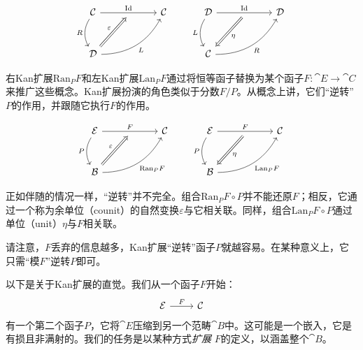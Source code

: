 \documentclass[DaoFP]{subfiles}
\begin{document}
 \[
  \begin{tikzcd} [row sep=1cm, column sep=1cm]
   \cat C
   \arrow[rr, "\text{Id}", "" {name=ID, below} ]
   \arrow[d, bend right, "R"']
   && \cat C
   \\
   \cat D
   \arrow[urr, bend right, "L"']
   \arrow[Rightarrow, "\varepsilon",  to=ID]
  \end{tikzcd}
  \qquad
  \begin{tikzcd} [row sep=1cm, column sep=1cm]
   \cat D
   \arrow[rr, "\text{Id}", "" {name=ID, below} ]
   \arrow[d, bend right, "L"']
   && \cat D
   \\
   \cat C
   \arrow[urr, bend right, "R"']
   \arrow[Rightarrow, "\eta",  from=ID]
  \end{tikzcd}
 \]

 右Kan扩展$\text{Ran}_P F$和左Kan扩展$\text{Lan}_P F$通过将恒等函子替换为某个函子$F \colon \cat E \to \cat C$来推广这些概念。Kan扩展扮演的角色类似于分数$F/P$。从概念上讲，它们“逆转”$P$的作用，并跟随它执行$F$的作用。

 \[
  \begin{tikzcd} [row sep=1cm, column sep=1cm]
   \cat E
   \arrow[rr, "F", "" {name=ID, below} ]
   \arrow[d, bend right, "P"']
   && \cat C
   \\
   \cat B
   \arrow[urr, bend right, "\text{Ran}_P F"']
   \arrow[Rightarrow, "\varepsilon",  to=ID]
  \end{tikzcd}
  \qquad
  \begin{tikzcd} [row sep=1cm, column sep=1cm]
   \cat E
   \arrow[rr, "F", "" {name=ID, below} ]
   \arrow[d, bend right, "P"']
   && \cat C
   \\
   \cat B
   \arrow[urr, bend right, "\text{Lan}_P F"']
   \arrow[Rightarrow, "\eta",  from=ID]
  \end{tikzcd}
 \]

 正如伴随的情况一样，“逆转”并不完全。组合$\text{Ran}_P F \circ P$并不能还原$F$；相反，它通过一个称为余单位（counit）的自然变换$\varepsilon$与它相关联。同样，组合$\text{Lan}_P F \circ P$通过单位（unit）$\eta$与$F$相关联。

 请注意，$F$丢弃的信息越多，Kan扩展“逆转”函子$P$就越容易。在某种意义上，它只需“模$F$”逆转$P$即可。

 以下是关于Kan扩展的直觉。我们从一个函子$F$开始：
 \[
  \begin{tikzcd} \cat E
  \arrow[r, "F"]
  & \cat C
  \end{tikzcd}
 \]
 有一个第二个函子$P$，它将$\cat E$压缩到另一个范畴$\cat B$中。这可能是一个嵌入，它是有损且非满射的。我们的任务是以某种方式\emph{扩展} $F$的定义，以涵盖整个$\cat B$。
\end{document}
